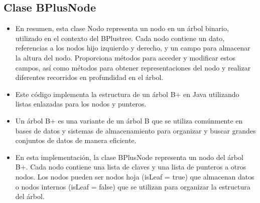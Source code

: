 \documentclass{article}
\begin{document}
	\subsection{Clase BPlusNode}
	\begin{itemize}	
		\item En resumen, esta clase Nodo representa un nodo en un árbol binario, utilizado en el contexto del BPlustree. Cada nodo contiene un dato, referencias a los nodos hijo izquierdo y derecho, y un campo para almacenar la altura del nodo. Proporciona métodos para acceder y modificar estos campos, así como métodos para obtener representaciones del nodo y realizar diferentes recorridos en profundidad en el árbol.
	\end{itemize}	
	
		

	\begin{itemize}
		\item Este código implementa la estructura de un árbol B+ en Java utilizando listas enlazadas para los nodos y punteros.

	\item Un árbol B+ es una variante de un árbol B que se utiliza comúnmente en bases de datos y sistemas de almacenamiento para organizar y buscar grandes conjuntos de datos de manera eficiente.

\item En esta implementación, la clase BPlusNode representa un nodo del árbol B+. Cada nodo contiene una lista de claves y una lista de punteros a otros nodos. Los nodos pueden ser nodos hoja (isLeaf = true) que almacenan datos o nodos internos (isLeaf = false) que se utilizan para organizar la estructura del árbol.

\end{itemize}
\end{document}
